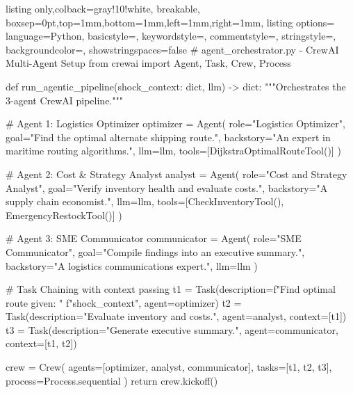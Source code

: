 \begin{tcblisting}{listing only,colback=gray!10!white, breakable, boxsep=0pt,top=1mm,bottom=1mm,left=1mm,right=1mm,
listing options={
language=Python,
basicstyle=\small\ttfamily,
keywordstyle=\color{blue},
commentstyle=\color{gray},
stringstyle=\color{red!70!black},
backgroundcolor=\color{gray!10},
showstringspaces=false}}
# agent_orchestrator.py - CrewAI Multi-Agent Setup
from crewai import Agent, Task, Crew, Process

def run_agentic_pipeline(shock_context: dict,
                          llm) -> dict:
    """Orchestrates the 3-agent CrewAI pipeline."""

    # Agent 1: Logistics Optimizer
    optimizer = Agent(
        role="Logistics Optimizer",
        goal="Find the optimal alternate shipping route.",
        backstory="An expert in maritime routing algorithms.",
        llm=llm,
        tools=[DijkstraOptimalRouteTool()]
    )

    # Agent 2: Cost & Strategy Analyst
    analyst = Agent(
        role="Cost and Strategy Analyst",
        goal="Verify inventory health and evaluate costs.",
        backstory="A supply chain economist.",
        llm=llm,
        tools=[CheckInventoryTool(), EmergencyRestockTool()]
    )

    # Agent 3: SME Communicator
    communicator = Agent(
        role="SME Communicator",
        goal="Compile findings into an executive summary.",
        backstory="A logistics communications expert.",
        llm=llm
    )

    # Task Chaining with context passing
    t1 = Task(description=f"Find optimal route given: "
              f"{shock_context}", agent=optimizer)
    t2 = Task(description="Evaluate inventory and costs.",
              agent=analyst, context=[t1])
    t3 = Task(description="Generate executive summary.",
              agent=communicator, context=[t1, t2])

    crew = Crew(
        agents=[optimizer, analyst, communicator],
        tasks=[t1, t2, t3],
        process=Process.sequential
    )
    return crew.kickoff()
\end{tcblisting}